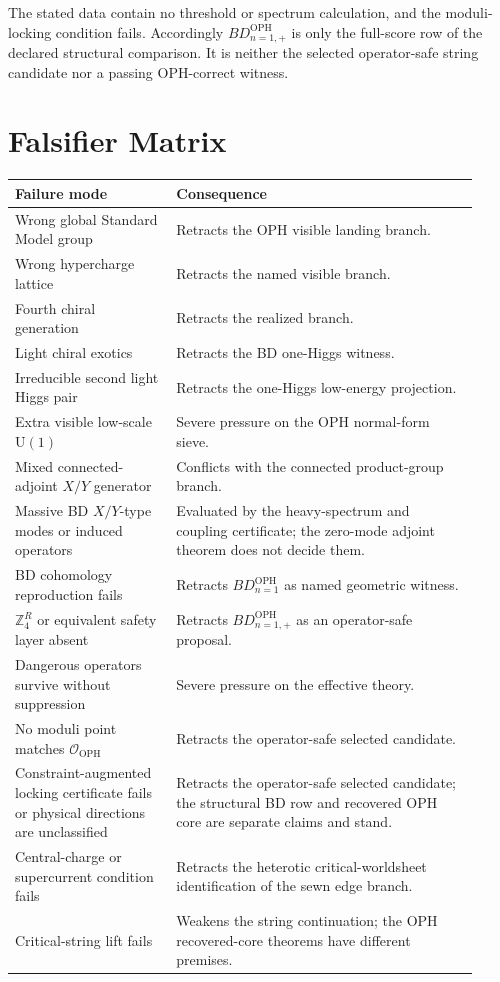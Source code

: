 \documentclass[11pt]{article}
\theoremstyle{remark}
\theoremstyle{plain}
\newcommand{\OPH}{\mathrm{OPH}}
\newcommand{\U}{\mathrm{U}}
\newcommand{\calO}{\mathcal O}
\newcommand{\ZfourR}{\mathbb Z_4^R}
\begin{document}
The stated data contain no threshold or spectrum calculation, and the moduli-locking condition fails.
Accordingly \(BD_{n=1,+}^{\OPH}\) is only the full-score row of the declared
structural comparison. It is neither the selected operator-safe string candidate nor a passing
OPH-correct witness.

\section{Falsifier Matrix}

\begin{longtable}{L{0.32\linewidth}L{0.60\linewidth}}
\toprule
\textbf{Failure mode} & \textbf{Consequence} \\
\midrule
Wrong global Standard Model group & Retracts the OPH visible landing branch. \\
Wrong hypercharge lattice & Retracts the named visible branch. \\
Fourth chiral generation & Retracts the realized branch. \\
Light chiral exotics & Retracts the BD one-Higgs witness. \\
Irreducible second light Higgs pair & Retracts the one-Higgs low-energy projection. \\
Extra visible low-scale \(\U(1)\) & Severe pressure on the OPH normal-form sieve. \\
Mixed connected-adjoint \(X/Y\) generator & Conflicts with the connected product-group branch. \\
Massive BD \(X/Y\)-type modes or induced operators & Evaluated by the heavy-spectrum and
coupling certificate; the zero-mode adjoint theorem does not decide them. \\
BD cohomology reproduction fails & Retracts \(BD_{n=1}^{\OPH}\) as named geometric witness. \\
\(\ZfourR\) or equivalent safety layer absent & Retracts \(BD_{n=1,+}^{\OPH}\) as
an operator-safe proposal. \\
Dangerous operators survive without suppression & Severe pressure on the effective theory. \\
No moduli point matches \(\calO_{\OPH}\) & Retracts the operator-safe selected candidate. \\
Constraint-augmented locking certificate fails or physical directions are unclassified & Retracts the
operator-safe selected candidate; the structural BD row and recovered OPH core are separate claims and stand. \\
Central-charge or supercurrent condition fails & Retracts the heterotic critical-worldsheet
identification of the sewn edge branch. \\
Critical-string lift fails & Weakens the string continuation; the OPH recovered-core theorems have different premises. \\
\bottomrule
\end{longtable}
\end{document}

